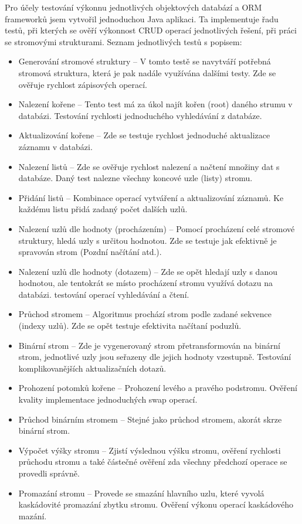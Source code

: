Pro účely testování výkonnu jednotlivých objektových databází a ORM frameworků jsem vytvořil jednoduchou Java aplikaci. Ta implementuje řadu testů, při kterých se ověří výkonnost CRUD operací jednotlivých řešení, při práci se stromovými strukturami. Seznam jednotlivých testů s popisem:
\begin{itemize}
  \item Generování stromové struktury -- V tomto testě se navytváří potřebná stromová struktura, která je pak nadále využívána dalšími testy. Zde se ověřuje rychlost zápisových operací.
  \item Nalezení kořene -- Tento test má za úkol najít kořen (root) daného strumu v databázi. Testování rychlosti jednoduchého vyhledávání z databáze.
  \item Aktualizování kořene -- Zde se testuje rychlost jednoduché aktualizace záznamu v databázi.
  \item Nalezení listů -- Zde se ověřuje rychlost nalezení a načtení množiny dat s databáze. Daný test nalezne všechny koncové uzle (listy) stromu.
  \item Přidání listů -- Kombinace operací vytváření a aktualizování záznamů. Ke každému listu přidá zadaný počet dalších uzlů.
  \item Nalezení uzlů dle hodnoty (procházením) -- Pomocí procházení celé stromové struktury, hledá uzly s určitou hodnotou. Zde se testuje jak efektivně je spravován strom (Pozdní načítání atd.).
  \item Nalezení uzlů dle hodnoty (dotazem) -- Zde se opět hledají uzly s danou hodnotou, ale tentokrát se místo procházení stromu využívá dotazu na databázi. testování operací vyhledávání a čtení.
  \item Průchod stromem -- Algoritmus prochází strom podle zadané sekvence (indexy uzlů). Zde se opět testuje efektivita načítaní poduzlů.
  \item Binární strom -- Zde je vygenerovaný strom přetransformován na binární strom, jednotlivé uzly jsou seřazeny dle jejich hodnoty vzestupně. Testování komplikovanějších aktualizačních dotazů.
  \item Prohození potomků kořene -- Prohození levého a pravého podstromu. Ověření kvality implementace jednoduchých swap operací.
  \item Průchod binárním stromem -- Stejné jako průchod stromem, akorát skrze binární strom.
  \item Výpočet výšky stromu -- Zjistí výslednou výšku stromu, ověření rychlosti průchodu stromu a také částečné ověření zda všechny předchozí operace se provedli správně.
  \item Promazání stromu -- Provede se smazání hlavního uzlu, které vyvolá kaskádovité promazání zbytku stromu. Ověření výkonu operací kaskádového mazání.
\end{itemize}

